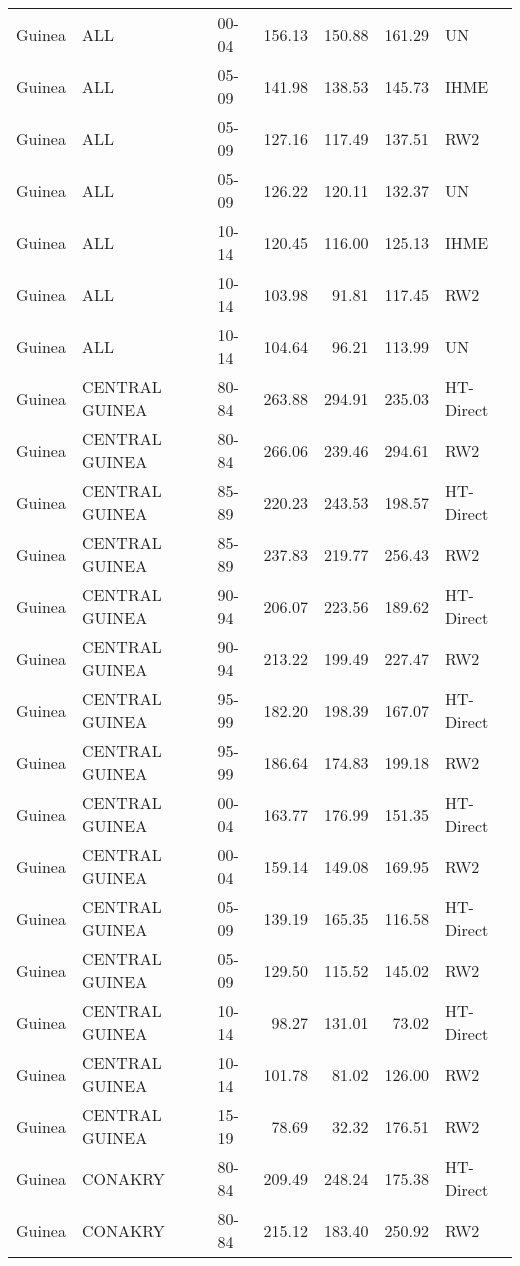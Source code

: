 \begin{longtable}{lllrrrl}
  Guinea & ALL & 00-04 & 156.13 & 150.88 & 161.29 & UN \\ 
  Guinea & ALL & 05-09 & 141.98 & 138.53 & 145.73 & IHME \\ 
  Guinea & ALL & 05-09 & 127.16 & 117.49 & 137.51 & RW2 \\ 
  Guinea & ALL & 05-09 & 126.22 & 120.11 & 132.37 & UN \\ 
  Guinea & ALL & 10-14 & 120.45 & 116.00 & 125.13 & IHME \\ 
  Guinea & ALL & 10-14 & 103.98 & 91.81 & 117.45 & RW2 \\ 
  Guinea & ALL & 10-14 & 104.64 & 96.21 & 113.99 & UN \\ 
  Guinea & CENTRAL GUINEA & 80-84 & 263.88 & 294.91 & 235.03 & HT-Direct \\ 
  Guinea & CENTRAL GUINEA & 80-84 & 266.06 & 239.46 & 294.61 & RW2 \\ 
  Guinea & CENTRAL GUINEA & 85-89 & 220.23 & 243.53 & 198.57 & HT-Direct \\ 
  Guinea & CENTRAL GUINEA & 85-89 & 237.83 & 219.77 & 256.43 & RW2 \\ 
  Guinea & CENTRAL GUINEA & 90-94 & 206.07 & 223.56 & 189.62 & HT-Direct \\ 
  Guinea & CENTRAL GUINEA & 90-94 & 213.22 & 199.49 & 227.47 & RW2 \\ 
  Guinea & CENTRAL GUINEA & 95-99 & 182.20 & 198.39 & 167.07 & HT-Direct \\ 
  Guinea & CENTRAL GUINEA & 95-99 & 186.64 & 174.83 & 199.18 & RW2 \\ 
  Guinea & CENTRAL GUINEA & 00-04 & 163.77 & 176.99 & 151.35 & HT-Direct \\ 
  Guinea & CENTRAL GUINEA & 00-04 & 159.14 & 149.08 & 169.95 & RW2 \\ 
  Guinea & CENTRAL GUINEA & 05-09 & 139.19 & 165.35 & 116.58 & HT-Direct \\ 
  Guinea & CENTRAL GUINEA & 05-09 & 129.50 & 115.52 & 145.02 & RW2 \\ 
  Guinea & CENTRAL GUINEA & 10-14 & 98.27 & 131.01 & 73.02 & HT-Direct \\ 
  Guinea & CENTRAL GUINEA & 10-14 & 101.78 & 81.02 & 126.00 & RW2 \\ 
  Guinea & CENTRAL GUINEA & 15-19 & 78.69 & 32.32 & 176.51 & RW2 \\ 
  Guinea & CONAKRY & 80-84 & 209.49 & 248.24 & 175.38 & HT-Direct \\ 
  Guinea & CONAKRY & 80-84 & 215.12 & 183.40 & 250.92 & RW2 \\ 

\end{longtable}
